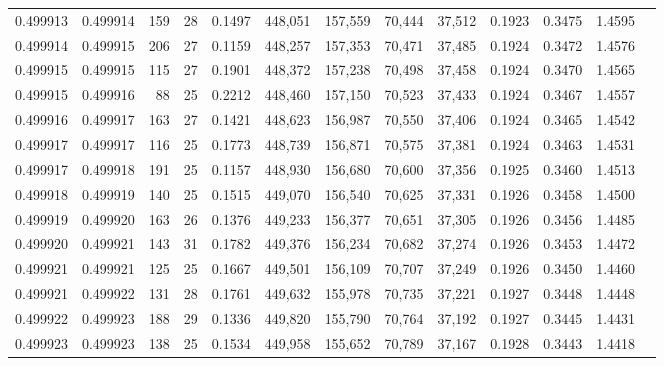 \begin{tabular}{rrrrrrrrrrrrr}
0.499913 & 0.499914 & 159 &  28 &                                     0.1497 & 448,051 & 157,559 &  70,444 &  37,512 & 0.1923 & 0.3475 & 1.4595 \\
0.499914 & 0.499915 & 206 &  27 &                                     0.1159 & 448,257 & 157,353 &  70,471 &  37,485 & 0.1924 & 0.3472 & 1.4576 \\
0.499915 & 0.499915 & 115 &  27 &                                     0.1901 & 448,372 & 157,238 &  70,498 &  37,458 & 0.1924 & 0.3470 & 1.4565 \\
0.499915 & 0.499916 &  88 &  25 &                                     0.2212 & 448,460 & 157,150 &  70,523 &  37,433 & 0.1924 & 0.3467 & 1.4557 \\
0.499916 & 0.499917 & 163 &  27 &                                     0.1421 & 448,623 & 156,987 &  70,550 &  37,406 & 0.1924 & 0.3465 & 1.4542 \\
0.499917 & 0.499917 & 116 &  25 &                                     0.1773 & 448,739 & 156,871 &  70,575 &  37,381 & 0.1924 & 0.3463 & 1.4531 \\
0.499917 & 0.499918 & 191 &  25 &                                     0.1157 & 448,930 & 156,680 &  70,600 &  37,356 & 0.1925 & 0.3460 & 1.4513 \\
0.499918 & 0.499919 & 140 &  25 &                                     0.1515 & 449,070 & 156,540 &  70,625 &  37,331 & 0.1926 & 0.3458 & 1.4500 \\
0.499919 & 0.499920 & 163 &  26 &                                     0.1376 & 449,233 & 156,377 &  70,651 &  37,305 & 0.1926 & 0.3456 & 1.4485 \\
0.499920 & 0.499921 & 143 &  31 &                                     0.1782 & 449,376 & 156,234 &  70,682 &  37,274 & 0.1926 & 0.3453 & 1.4472 \\
0.499921 & 0.499921 & 125 &  25 &                                     0.1667 & 449,501 & 156,109 &  70,707 &  37,249 & 0.1926 & 0.3450 & 1.4460 \\
0.499921 & 0.499922 & 131 &  28 &                                     0.1761 & 449,632 & 155,978 &  70,735 &  37,221 & 0.1927 & 0.3448 & 1.4448 \\
0.499922 & 0.499923 & 188 &  29 &                                     0.1336 & 449,820 & 155,790 &  70,764 &  37,192 & 0.1927 & 0.3445 & 1.4431 \\
0.499923 & 0.499923 & 138 &  25 &                                     0.1534 & 449,958 & 155,652 &  70,789 &  37,167 & 0.1928 & 0.3443 & 1.4418 \\

\end{tabular}
